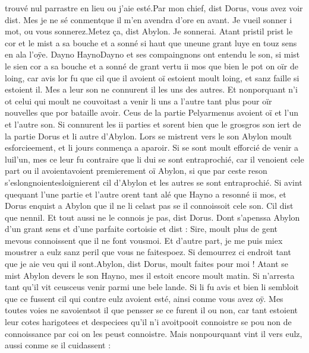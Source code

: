 \documentclass{article}
\begin{document}
\begin{pages}
      trouvé nul parrastre en lieu ou j’aie esté.Par mon chief, dist Dorus, vous avez voir dist. 
      Mes je ne sé conmentque il m’en avendra d’ore en avant. Je vueil sonner 
      i mot, ou vous sonnerez.Metez ça, dist Abylon. Je sonnerai.
   Atant pristil prist le cor et le mist a sa bouche et a sonné si haut que 
   uneune grant luye en touz sens en ala l’oÿe. 
   Dayno \pend
\pstart HaynoDayno 
   et ses compaingnons ont entendu le son, 
   si mist le sien cor a sa bouche et a sonné de grant vertu ii mos que bien le pot on oïr de loing, 
   car avis lor fu que cil que il avoient oï estoient moult loing, et sanz faille si estoient il. 
   Mes a leur son ne connurent il 
   les uns des autres. Et nonporquant n’i ot celui qui moult ne couvoitast a 
   venir li uns a l’autre tant plus pour oïr nouvelles que por bataille avoir. Ceus de la partie 
   Pelyarmenus avoient oï et l’un et l’autre son. Si connurent les ii parties et sorent 
   bien que le grosgros son iert de la partie 
   Dorus et li autre d’Abylon. Lors se mistrent vers le son 
   Abylon moult esforcieement, et li jours conmença a aparoir. Si se sont moult efforcié de venir a 
   luil'un, mes ce leur fu contraire que li dui se sont entraprochié, 
   car il venoient cele part ou il 
   avoientavoient premierement oï 
   Abylon, si que par ceste reson s’eslongnoientesloignierent 
      cil d’Abylon et les autres se sont entraprochié. 
   Si avint quequant l’une partie et l’autre orent tant alé que 
   Hayno a resonné ii mos, et Dorus enquist a 
   Abylon que il ne li celast pas se il connoissoit 
      cele son. 
   Cil dist que nennil.
   Et tout aussi ne le connois je pas, dist Dorus. \pend
\pstart Dont s’apenssa Abylon d’un grant sens et d’une parfaite cortoisie et 
   dist :
   Sire, moult plus de gent mevous 
      connoissent que il ne font vousmoi. Et d’autre part, 
      je me puis miex moustrer a eulz sanz peril que vous ne faitespoez. Si 
      demourrez ci endroit tant que je aie veu qui il sont.Abylon, dist Dorus, 
      moult faites pour moi !
   Atant se mist Abylon devers le son Hayno, 
   mes il estoit encore moult matin. Si n’arresta tant qu’il vit ceusceus venir 
   parmi une bele lande. Si li fu avis et bien li sembloit 
   que ce fussent cil qui contre eulz avoient esté, ainsi conme vous avez oÿ. 
   Mes toutes voies ne savoientsot il que pensser se ce furent il ou non, 
   car tant estoient leur cotes harigotees et despeciees qu’il n’i 
   avoitpooit connoistre se pou non de connoissance 
   par coi on les peust connoistre. Mais nonpourquant vint il vers eulz, 
   aussi conme se il cuidassent :

\end{pages}
\end{document}
